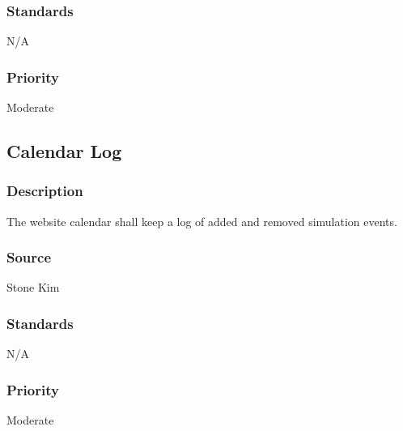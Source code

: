 \subsubsection{Standards}
N/A
\subsubsection{Priority}
Moderate

\subsection{Calendar Log}
\subsubsection{Description}
The website calendar shall keep a log of added and removed simulation events.
\subsubsection{Source}
Stone Kim
\subsubsection{Standards}
N/A
\subsubsection{Priority}
Moderate